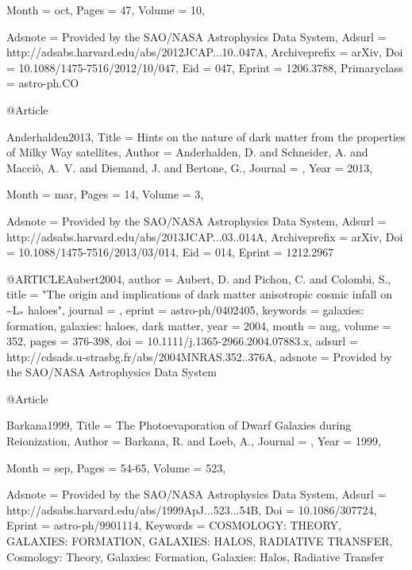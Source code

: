 \documentclass[useAMS,usenatbib]{mnras}
\begin{document}
{{{{{{{{{{{{{{{{{{{  Month                    = oct,
  Pages                    = {47},
  Volume                   = {10},

  Adsnote                  = {Provided by the SAO/NASA Astrophysics Data System},
  Adsurl                   = {http://adsabs.harvard.edu/abs/2012JCAP...10..047A},
  Archiveprefix            = {arXiv},
  Doi                      = {10.1088/1475-7516/2012/10/047},
  Eid                      = {047},
  Eprint                   = {1206.3788},
  Primaryclass             = {astro-ph.CO}
}

@Article{Anderhalden2013,
  Title                    = {{Hints on the nature of dark matter from the properties of Milky Way satellites}},
  Author                   = {{Anderhalden}, D. and {Schneider}, A. and {Macci{\`o}}, A.~V. and {Diemand}, J. and {Bertone}, G.},
  Journal                  = {\jcap},
  Year                     = {2013},

  Month                    = mar,
  Pages                    = {14},
  Volume                   = {3},

  Adsnote                  = {Provided by the SAO/NASA Astrophysics Data System},
  Adsurl                   = {http://adsabs.harvard.edu/abs/2013JCAP...03..014A},
  Archiveprefix            = {arXiv},
  Doi                      = {10.1088/1475-7516/2013/03/014},
  Eid                      = {014},
  Eprint                   = {1212.2967}
}

@ARTICLE{Aubert2004,
   author = {{Aubert}, D. and {Pichon}, C. and {Colombi}, S.},
    title = "{The origin and implications of dark matter anisotropic cosmic infall on \~{}L$_{*}$ haloes}",
  journal = {\mnras},
   eprint = {astro-ph/0402405},
 keywords = {galaxies: formation, galaxies: haloes, dark matter},
     year = 2004,
    month = aug,
   volume = 352,
    pages = {376-398},
      doi = {10.1111/j.1365-2966.2004.07883.x},
   adsurl = {http://cdsads.u-strasbg.fr/abs/2004MNRAS.352..376A},
  adsnote = {Provided by the SAO/NASA Astrophysics Data System}
}

@Article{Barkana1999,
  Title                    = {{The Photoevaporation of Dwarf Galaxies during Reionization}},
  Author                   = {{Barkana}, R. and {Loeb}, A.},
  Journal                  = {\apj},
  Year                     = {1999},

  Month                    = sep,
  Pages                    = {54-65},
  Volume                   = {523},

  Adsnote                  = {Provided by the SAO/NASA Astrophysics Data System},
  Adsurl                   = {http://adsabs.harvard.edu/abs/1999ApJ...523...54B},
  Doi                      = {10.1086/307724},
  Eprint                   = {astro-ph/9901114},
  Keywords                 = {COSMOLOGY: THEORY, GALAXIES: FORMATION, GALAXIES: HALOS, RADIATIVE TRANSFER, Cosmology: Theory, Galaxies: Formation, Galaxies: Halos, Radiative Transfer}
}

}}}}}}}}}}}}}}}}}}
\end{document}
